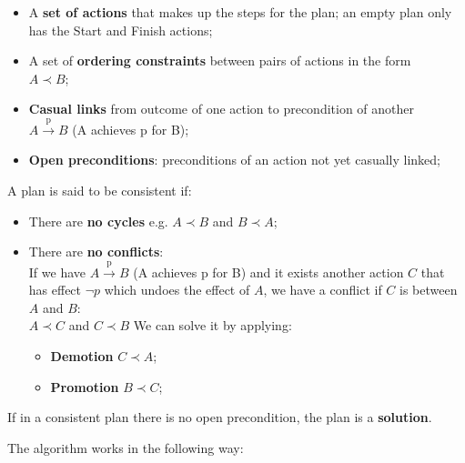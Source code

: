 \documentclass{article}
\begin{document}
\begin{itemize}
\begin{itemize}
    \item A \textbf{set of actions} that makes up the steps for the plan; an empty plan only has the Start and Finish actions;
    \item A set of \textbf{ordering constraints} between pairs of actions in the form \\ $A \prec B$;
    \item \textbf{Casual links} from outcome of one action to precondition of another \\ $A \xrightarrow{\text{p}} B$ (A achieves p for B);
    \item \textbf{Open preconditions}: preconditions of an action not yet casually linked;

\end{itemize}

A plan is said to be consistent if:

\begin{itemize}
    \item There are \textbf{no cycles}  e.g. $A \prec B$ and $B \prec A$;
    \item There are \textbf{no conflicts}: \\
        If we have $A \xrightarrow{\text{p}} B$ (A achieves p for B) and it exists another action $C$ that has effect $\neg p$ which undoes the effect of $A$, we have a conflict if $C$ is between $A$ and $B$: \\
        $A \prec C$ and $C \prec B$
        We can solve it by applying:
        \begin{itemize}[label=$\bullet$]
            \item \textbf{Demotion} $C \prec A$;
            \item \textbf{Promotion} $B \prec C$;            
        \end{itemize}
\end{itemize}

\begin{flushleft}
    If in a consistent plan there is no open precondition, the plan is a \textbf{solution}.    
\end{flushleft}

\newpage

The algorithm works in the following way:


\end{itemize}
\end{document}
